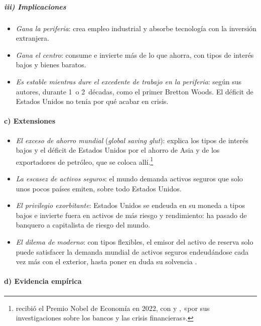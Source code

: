 \documentclass[11pt]{article}
\begin{document}
\subparagraph{iii) Implicaciones}

\begin{itemize}
\item \emph{Gana la periferia}: crea empleo industrial y absorbe tecnología con la inversión extranjera.
\item \emph{Gana el centro}: consume e invierte más de lo que ahorra, con tipos de interés bajos y bienes baratos.
\item \emph{Es estable mientras dure el excedente de trabajo en la periferia}: según sus autores, durante 1~o 2~décadas, como el primer Bretton Woods. El déficit de Estados Unidos no tenía por qué acabar en crisis.
\end{itemize}

\paragraph{c) Extensiones}

\begin{itemize}
\item \emph{El exceso de ahorro mundial} (\emph{global saving glut}): \textcite{Bernanke2005Saving} explica los tipos de interés bajos y el déficit de Estados Unidos por el ahorro de Asia y de los exportadores de petróleo, que se coloca allí.\footnote{ recibió el Premio Nobel de Economía en 2022, con  y , «por sus investigaciones sobre los bancos y las crisis financieras»\nocite{Nobel2022Bancos}.}
\item \emph{La escasez de activos seguros}: el mundo demanda activos seguros que solo unos pocos países emiten, sobre todo Estados Unidos\nocite{CaballeroFarhiGourinchas2017Safe}.
\item \emph{El privilegio exorbitante}: Estados Unidos se endeuda en su moneda a tipos bajos e invierte fuera en activos de más riesgo y rendimiento: ha pasado de banquero a capitalista de riesgo del mundo\nocite{GourinchasRey2007}.
\item \emph{El dilema de  moderno}: con tipos flexibles, el emisor del activo de reserva solo puede satisfacer la demanda mundial de activos seguros endeudándose cada vez más con el exterior, hasta poner en duda su solvencia\nocite{FarhiGourinchasRey2011} .
\end{itemize}

\paragraph{d) Evidencia empírica}
\end{document}
